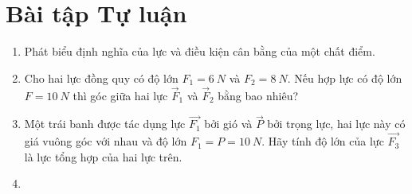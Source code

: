 \section{Bài tập Tự luận}
\begin{enumerate}[label=\bfseries Bài \arabic*:,leftmargin=1.5cm]
	\item {}
	
	{
		Phát biểu định nghĩa của lực và điều kiện cân bằng của một chất điểm.
	}
	
	\item {}
	
	{
		Cho hai lực đồng quy có độ lớn $F_1 = \SI{6}{N}$ và $F_2 = \SI{8}{N}$. Nếu hợp lực có độ lớn $F = \SI{10}{N}$ thì góc giữa hai lực $\vec F_1$ và $\vec F_2$ bằng bao nhiêu?
	}
	
	
	\item {}
	
	{ Một trái banh được tác dụng lực $\vec{F_1}$ bởi gió và $\vec{P}$ bởi trọng lực, hai lực này có giá vuông góc với nhau và độ lớn $F_1=P=\SI{10}{N}$. Hãy tính độ lớn của lực $\vec{F_3}$ là lực tổng hợp của hai lực trên.
		
	}
	\item {}
	

\end{enumerate}
